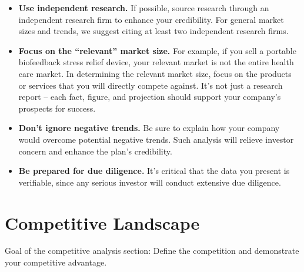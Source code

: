 \documentclass[9pt,]{book}
\providecommand{\tightlist}{%
  \setlength{\itemsep}{0pt}\setlength{\parskip}{0pt}}
\begin{document}
\begin{itemize}
\tightlist
\item
  \textbf{Use independent research.} If possible, source research
  through an independent research firm to enhance your credibility. For
  general market sizes and trends, we suggest citing at least two
  independent research firms.
\item
  \textbf{Focus on the ``relevant'' market size.} For example, if you
  sell a portable biofeedback stress relief device, your relevant market
  is not the entire health care market. In determining the relevant
  market size, focus on the products or services that you will directly
  compete against. It's not just a research report -- each fact, figure,
  and projection should support your company's prospects for success.
\item
  \textbf{Don't ignore negative trends.} Be sure to explain how your
  company would overcome potential negative trends. Such analysis will
  relieve investor concern and enhance the plan's credibility.
\item
  \textbf{Be prepared for due diligence.} It's critical that the data
  you present is verifiable, since any serious investor will conduct
  extensive due diligence.
\end{itemize}

\hypertarget{competitive-landscape}{%
\section{Competitive Landscape}\label{competitive-landscape}}

Goal of the competitive analysis section: Define the competition and
demonstrate your competitive advantage.
\end{document}

